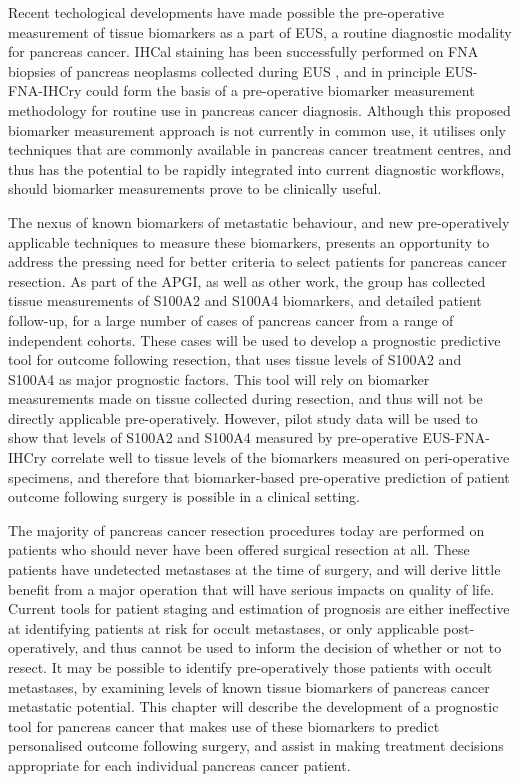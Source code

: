 \documentclass[dissertation.tex]{subfiles}
\begin{document}
Recent techological developments have made possible the pre-operative measurement of tissue biomarkers as a part of \gls{EUS}, a routine diagnostic modality for pancreas cancer.  \Gls{IHCal} staining has been successfully performed on \gls{FNA} biopsies of pancreas neoplasms collected during \gls{EUS} \cite{Popescu2012, Salla2009, Stelow2005}, and in principle \gls{EUS}-\gls{FNA}-\acrshort{IHCry} could form the basis of a pre-operative biomarker measurement methodology for routine use in pancreas cancer diagnosis.  Although this proposed biomarker measurement approach is not currently in common use, it utilises only techniques that are commonly available in pancreas cancer treatment centres, and thus has the potential to be rapidly integrated into current diagnostic workflows, should biomarker measurements prove to be clinically useful.

The nexus of known biomarkers of metastatic behaviour, and new pre-operatively applicable techniques to measure these biomarkers, presents an opportunity to address the pressing need for better criteria to select patients for pancreas cancer resection.  As part of the \gls{APGI}, as well as other work, the group has collected tissue measurements of S100A2 and S100A4 biomarkers, and detailed patient follow-up, for a large number of cases of pancreas cancer from a range of independent cohorts.  These cases will be used to develop a prognostic predictive tool for outcome following resection, that uses tissue levels of S100A2 and S100A4 as major prognostic factors.  This tool will rely on biomarker measurements made on tissue collected during resection, and thus will not be directly applicable pre-operatively.  However, pilot study data will be used to show that levels of S100A2 and S100A4 measured by pre-operative \gls{EUS}-\gls{FNA}-\acrshort{IHCry} correlate well to tissue levels of the biomarkers measured on peri-operative specimens, and therefore that biomarker-based pre-operative prediction of patient outcome following surgery is possible in a clinical setting.

The majority of pancreas cancer resection procedures today are performed on patients who should never have been offered surgical resection at all.  These patients have undetected metastases at the time of surgery, and will derive little benefit from a major operation that will have serious impacts on quality of life.  Current tools for patient staging and estimation of prognosis are either ineffective at identifying patients at risk for occult metastases, or only applicable post-operatively, and thus cannot be used to inform the decision of whether or not to resect.  It may be possible to identify pre-operatively those patients with occult metastases, by examining levels of known tissue biomarkers of pancreas cancer metastatic potential.  This chapter will describe the development of a prognostic tool for pancreas cancer that makes use of these biomarkers to predict personalised outcome following surgery, and assist in making treatment decisions appropriate for each individual pancreas cancer patient.
\end{document}

